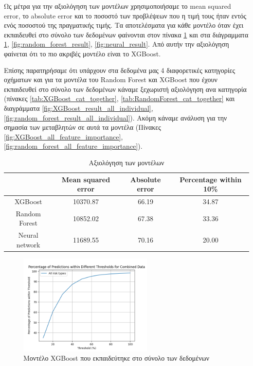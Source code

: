 \documentclass{llncs}
\begin{document}
Ως μέτρα για την αξιολόγηση των μοντέλων χρησιμοποιήσαμε το mean squared error, το absolute error και το ποσοστό των προβλέψεων που η τιμή τους 
ήταν εντός ενός ποσοστού της πραγματικής τιμής. Τα αποτελέσματα για κάθε μοντέλο όταν έχει εκπαιδευθεί στο σύνολο των δεδομένων
φαίνονται στον πίνακα \ref{tab:3x3table} και στα διάγραμματα \ref{fig:XGBoost_result}, 
\ref{fig:random_forest_result}, \ref{fig:neural_result}. Από αυτήν την αξιολόγηση φαίνεται ότι το πιο ακριβές μοντέλο
είναι το XGBoost.

Επίσης παρατηρήσαμε ότι υπάρχουν στα δεδομένα μας 4 διαφορετικές κατηγορίες οχήματων και
για τα μοντέλα του Random Forest και XGBoost που έχουν εκπαιδευθεί στο σύνολο των δεδομένων
κάναμε ξεχωριστή αξιολόγηση ανα κατηγορία 
(πίνακες \ref{tab:XGBoost_cat_together}, \ref{tab:RandomForest_cat_together} 
και διαγράμματα 
\ref{fig:XGBoost_result_all_individual}, \ref{fig:random_forest_result_all_individual}). Ακόμη κάναμε ανάλυση για την σημασία των μεταβλητών σε αυτά τα μοντέλα 
(Πίνακες \ref{fig:XGBoost_all_feature_importance}, 
\ref{fig:random_forest_all_feature_importance}).




\begin{table}
    \centering
    \begin{tabular}{|c|c|c|c|} %
        \hline
         &Mean squared error & Absolute error & Percentage within 10\% \\ %
        \hline
        XGBoost & 10370.87 & 66.19 & 34.87 \\
        Random Forest & 10852.02 & 67.38 & 33.36 \\
        Neural network & 11689.55 & 70.16 & 20.00 \\
        \hline
    \end{tabular}
    \caption{Αξιολόγηση των μοντέλων}
    \label{tab:3x3table}
\end{table}

\begin{figure}
    \begin{center}
        \includegraphics[width=0.6\textwidth]{images/combined_trained_all_thresholds_xgb.png}
    \end{center}
    \caption{Μοντέλο XGBoost που εκπαιδεύτηκε στο σύνολο των δεδομένων}  
    \label{fig:XGBoost_result}  
\end{figure}
\end{document}
